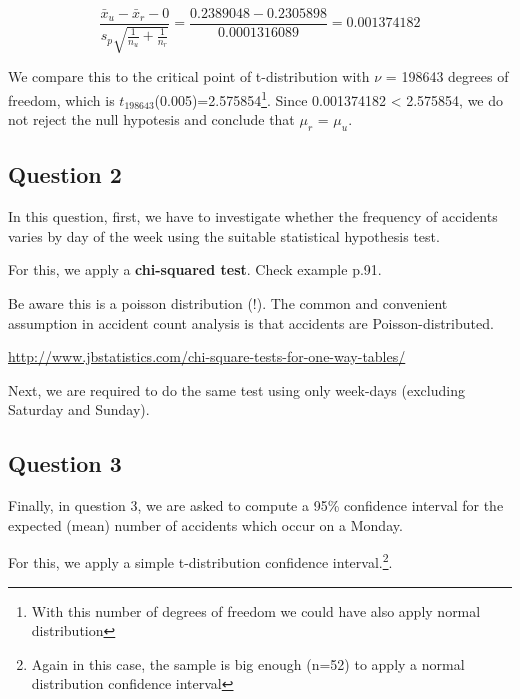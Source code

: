 \documentclass[]{article}
\newenvironment{Shaded}{\begin{snugshade}}{\end{snugshade}}
\newcommand{\KeywordTok}[1]{\textcolor[rgb]{0.13,0.29,0.53}{\textbf{{#1}}}}
\newcommand{\DataTypeTok}[1]{\textcolor[rgb]{0.13,0.29,0.53}{{#1}}}
\newcommand{\StringTok}[1]{\textcolor[rgb]{0.31,0.60,0.02}{{#1}}}
\newcommand{\CommentTok}[1]{\textcolor[rgb]{0.56,0.35,0.01}{\textit{{#1}}}}
\newcommand{\NormalTok}[1]{{#1}}
\let\rmarkdownfootnote\footnote%
\def\footnote{\protect\rmarkdownfootnote}
\begin{document}
\[\frac{\bar x_{u}-\bar x_{r}-0}{s_{p}\sqrt{\frac{1}{n_{u}}+\frac{1}{n_{r}}}}=\frac{0.2389048-0.2305898}{0.0001316089}=0.001374182\]

We compare this to the critical point of t-distribution with \(\nu\) =
198643 degrees of freedom, which is
\(t_{198643}\)(0.005)=2.575854\footnote{With this number of degrees of
  freedom we could have also apply normal distribution}. Since
0.001374182 \textless{} 2.575854, we do not reject the null hypotesis
and conclude that \(\mu_{r}\) = \(\mu_{u}\).

\subsection{Question 2}\label{question-2}

In this question, first, we have to investigate whether the frequency of
accidents varies by day of the week using the suitable statistical
hypothesis test.

For this, we apply a \textbf{chi-squared test}. Check example p.91.

Be aware this is a poisson distribution (!). The common and convenient
assumption in accident count analysis is that accidents are
Poisson-distributed.

\url{http://www.jbstatistics.com/chi-square-tests-for-one-way-tables/}

Next, we are required to do the same test using only week-days
(excluding Saturday and Sunday).

\subsection{Question 3}\label{question-3}

Finally, in question 3, we are asked to compute a 95\% confidence
interval for the expected (mean) number of accidents which occur on a
Monday.

For this, we apply a simple t-distribution confidence
interval.\footnote{Again in this case, the sample is big enough (n=52)
  to apply a normal distribution confidence interval}.

\begin{Shaded}
\end{Shaded}
\end{document}
